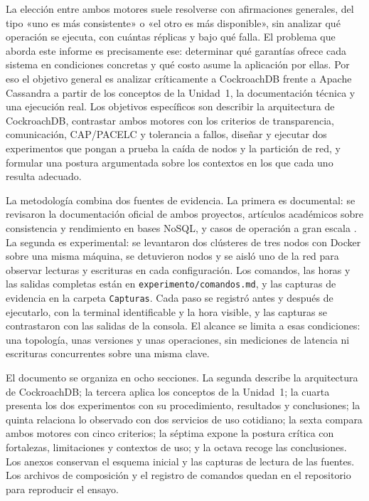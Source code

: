 \documentclass[11pt,a4paper]{article}
\newcommand{\sistemaA}{CockroachDB}      %
\newcommand{\sistemaB}{Apache Cassandra} %
\begin{document}
La elección entre ambos motores suele resolverse con afirmaciones generales, del tipo
«uno es más consistente» o «el otro es más disponible», sin analizar qué operación se
ejecuta, con cuántas réplicas y bajo qué falla. El problema que aborda este informe es
precisamente ese: determinar qué garantías ofrece cada sistema en condiciones
concretas y qué costo asume la aplicación por ellas. Por eso el objetivo general es
analizar críticamente a \sistemaA{} frente a \sistemaB{} a partir de los conceptos de
la Unidad~1, la documentación técnica y una ejecución real. Los objetivos específicos
son describir la arquitectura de \sistemaA{}, contrastar ambos motores con los
criterios de transparencia, comunicación, CAP/PACELC y tolerancia a fallos, diseñar y
ejecutar dos experimentos que pongan a prueba la caída de nodos y la partición de red,
y formular una postura argumentada sobre los contextos en los que cada uno resulta
adecuado.

La metodología combina dos fuentes de evidencia. La primera es documental: se
revisaron la documentación oficial de ambos proyectos, artículos académicos sobre
consistencia y rendimiento en bases NoSQL, y casos de operación a gran escala
\cite{apacheCassandraGuarantees,ferreira2024consistency,discord2023cassandra}. La
segunda es experimental: se levantaron dos clústeres de tres nodos con Docker sobre
una misma máquina, se detuvieron nodos y se aisló uno de la red para observar
lecturas y escrituras en cada configuración. Los comandos, las horas y las salidas
completas están en \texttt{experimento/comandos.md}, y las capturas de evidencia en
la carpeta \texttt{Capturas}. Cada paso se registró antes y después de ejecutarlo,
con la terminal identificable y la hora visible, y las capturas se contrastaron con
las salidas de la consola. El alcance se limita a esas condiciones: una topología,
unas versiones y unas operaciones, sin mediciones de latencia ni escrituras
concurrentes sobre una misma clave.

El documento se organiza en ocho secciones. La segunda describe la arquitectura de
\sistemaA{}; la tercera aplica los conceptos de la Unidad~1; la cuarta presenta los
dos experimentos con su procedimiento, resultados y conclusiones; la quinta relaciona
lo observado con dos servicios de uso cotidiano; la sexta compara ambos motores con
cinco criterios; la séptima expone la postura crítica con fortalezas, limitaciones y
contextos de uso; y la octava recoge las conclusiones. Los anexos conservan el
esquema inicial y las capturas de lectura de las fuentes. Los archivos de
composición y el registro de comandos quedan en el repositorio para reproducir el
ensayo.
\clearpage
\end{document}
